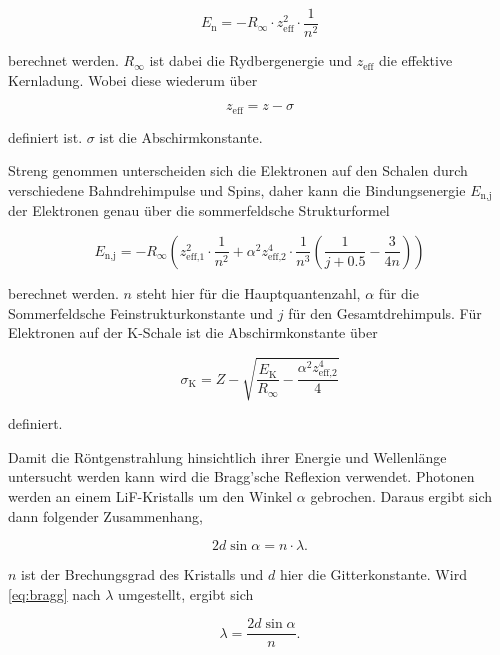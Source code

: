 \begin{equation}
    E_\text{n} = - R_\infty \cdot z_\text{eff}^2 \cdot \frac{1}{n^2}
    \label{eq:en}
\end{equation}

berechnet werden.
$R_\infty$ ist dabei die Rydbergenergie und $z_\text{eff}$ die effektive Kernladung.
Wobei diese wiederum über

\begin{equation}
    z_\text{eff} = z - \sigma
    \label{eq:z}
\end{equation}

definiert ist.
$\sigma$ ist die Abschirmkonstante.

Streng genommen unterscheiden sich die Elektronen auf den Schalen durch verschiedene Bahndrehimpulse und Spins, daher kann die Bindungsenergie $E_\text{n,j}$ der Elektronen genau über die sommerfeldsche Strukturformel

\begin{equation}
    E_\text{n,j} = - R_\infty \left(z_\text{eff,1}^2 \cdot \frac{1}{n^2} + \alpha ^2 z_\text{eff,2}^4  \cdot \frac{1}{n^3} \left(\frac{1}{j + 0.5} - \frac{3}{4 n}   \right)\right)
    \label{eq:sommerfeld}
\end{equation}

berechnet werden.
$n$ steht hier für die Hauptquantenzahl, $\alpha$ für die Sommerfeldsche Feinstrukturkonstante und $j$ für den Gesamtdrehimpuls.
Für Elektronen auf der K-Schale ist die Abschirmkonstante über 

\begin{equation}
    \sigma _\text{K} = Z - \sqrt{\frac{E_\text{K}}{R_\infty} - \frac{\alpha ^2 z_\text{eff,2}^4}{4}}
    \label{eq:sigma}
\end{equation}

definiert.

Damit die Röntgenstrahlung hinsichtlich ihrer Energie und Wellenlänge untersucht werden kann wird die Bragg'sche Reflexion verwendet.
Photonen werden an einem LiF-Kristalls um den Winkel $\alpha$ gebrochen.
Daraus ergibt sich dann folgender Zusammenhang,

\begin{equation}
    2 d \sin{\alpha} = n \cdot \lambda.
    \label{eq:bragg}
\end{equation}

$n$ ist der Brechungsgrad des Kristalls und $d$ hier die Gitterkonstante.
Wird \eqref{eq:bragg} nach $\lambda$ umgestellt, ergibt sich 

\begin{equation}
   \lambda = \frac{2 d \sin{\alpha}}{n}.
   \label{eq:lambda}
\end{equation}